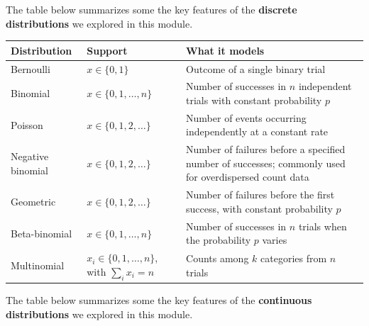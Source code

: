 \documentclass[
  13,
  letterpaper,
]{report}
\begin{document}
The table below summarizes some the key features of the \textbf{discrete
distributions} we explored in this module.

\begin{longtable}[]{@{}
  >{\raggedright\arraybackslash}p{}
  >{\raggedright\arraybackslash}p{}
  >{\raggedright\arraybackslash}p{}@{}}
\toprule\noalign{}
\begin{minipage}[b]{\linewidth}\raggedright
Distribution
\end{minipage} & \begin{minipage}[b]{\linewidth}\raggedright
Support
\end{minipage} & \begin{minipage}[b]{\linewidth}\raggedright
What it models
\end{minipage} \\
\midrule\noalign{}
\endhead
\bottomrule\noalign{}
\endlastfoot
Bernoulli & \(x\in\{0,1\}\) & Outcome of a single binary trial \\
Binomial & \(x\in\{0,1,\ldots,n\}\) & Number of successes in \(n\)
independent trials with constant probability \(p\) \\
Poisson & \(x\in\{0,1,2,\ldots\}\) & Number of events occurring
independently at a constant rate \\
Negative binomial & \(x\in\{0,1,2,\ldots\}\) & Number of failures before
a specified number of successes; commonly used for overdispersed count
data \\
Geometric & \(x\in\{0,1,2,\ldots\}\) & Number of failures before the
first success, with constant probability \(p\) \\
Beta-binomial & \(x\in\{0,1,\ldots,n\}\) & Number of successes in \(n\)
trials when the probability \(p\) varies \\
Multinomial & \(x_i\in\{0,1,\ldots,n\}\), with \(\sum_i x_i=n\) & Counts
among \(k\) categories from \(n\) trials \\
\end{longtable}

The table below summarizes some the key features of the
\textbf{continuous distributions} we explored in this module.
\end{document}
